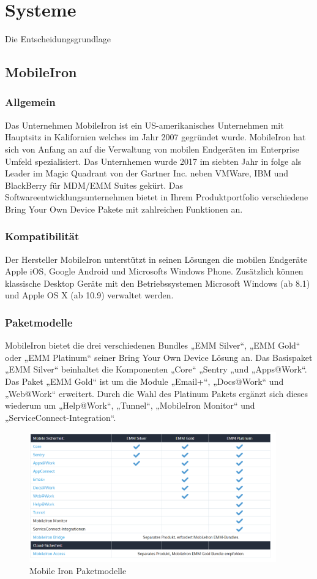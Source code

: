 \chapter{Systeme}
\label{cha:systeme}
Die Entscheidungsgrundlage 

\section{MobileIron}

\subsection {Allgemein} 
Das Unternehmen MobileIron ist ein US-amerikanisches Unternehmen mit Hauptsitz in Kalifornien welches im Jahr 2007 gegründet wurde. MobileIron hat sich von Anfang an auf die Verwaltung von mobilen Endgeräten im Enterprise Umfeld spezialisiert. Das Unternhemen wurde 2017 im siebten Jahr in folge als Leader im Magic Quadrant von der Gartner Inc. neben VMWare, IBM und BlackBerry für MDM/EMM Suites gekürt. Das Softwareentwicklungsunternehmen bietet in Ihrem Produktportfolio verschiedene Bring Your Own Device Pakete mit zahlreichen Funktionen an. 
\subsection {Kompatibilität}
Der Hersteller MobileIron unterstützt in seinen Lösungen die  mobilen Endgeräte Apple iOS, Google Android und Microsofts Windows Phone. Zusätzlich können klassische Desktop Geräte mit den Betriebssystemen Microsoft Windows (ab 8.1) und Apple OS X (ab 10.9)  verwaltet werden. 
\subsection {Paketmodelle}
MobileIron bietet die drei verschiedenen Bundles „EMM Silver“, „EMM Gold“ oder „EMM Platinum“ seiner Bring Your Own Device Lösung an.
Das Basispaket „EMM Silver“ beinhaltet die Komponenten „Core“ „Sentry „und „Apps@Work“. Das Paket „EMM Gold“ ist um die Module „Email+“, „Docs@Work“ und „Web@Work“ erweitert. Durch die Wahl des Platinum Pakets ergänzt sich dieses wiederum um „Help@Work“, „Tunnel“, „MobileIron Monitor“ und „ServiceConnect-Integration“.

\begin{figure}[hbt]
\centering
\includegraphics[width=0.95\textwidth]{Bilder/mi_1.png} 
\caption{Mobile Iron Paketmodelle}\label{fig:MobIro1}
\end{figure}

